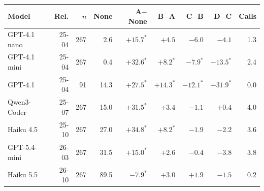 \begin{tabular}{@{}lrrrrrrrr@{}}
\toprule
Model & Rel. & $n$ & None & A$-$None & B$-$A & C$-$B & D$-$C & Calls \\
\midrule
GPT-4.1 nano & 25-04 & 267 & 2.6 & $+15.7^\ast$ & $+4.5$ & $-6.0$ & $-4.1$ & 1.3 \\
GPT-4.1 mini & 25-04 & 267 & 0.4 & $+32.6^\ast$ & $+8.2^\ast$ & $-7.9^\ast$ & $-13.5^\ast$ & 2.4 \\
GPT-4.1 & 25-04 & 91 & 14.3 & $+27.5^\ast$ & $+14.3^\ast$ & $-12.1^\ast$ & $-31.9^\ast$ & 0.0 \\
Qwen3-Coder & 25-07 & 267 & 15.0 & $+31.5^\ast$ & $+3.4$ & $-1.1$ & $+0.4$ & 4.0 \\
Haiku 4.5 & 25-10 & 267 & 27.0 & $+34.8^\ast$ & $+8.2^\ast$ & $-1.9$ & $-2.2$ & 3.6 \\
GPT-5.4-mini & 26-03 & 267 & 31.5 & $+15.0^\ast$ & $+2.6$ & $-0.4$ & $-3.8$ & 3.8 \\
Haiku 5.5 & 26-10 & 267 & 89.5 & $-7.9^\ast$ & $+3.0$ & $+1.9$ & $-1.5$ & 0.2 \\
\bottomrule
\end{tabular}